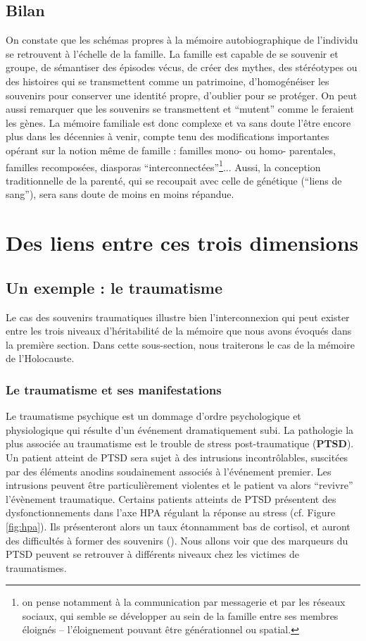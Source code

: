 \documentclass[french]{article}
\begin{document}
		\subsection{Bilan}
			On constate que les schémas propres à la mémoire autobiographique de l'individu se retrouvent à l'échelle de la famille. La famille est capable de se souvenir et groupe, de sémantiser des épisodes vécus, de créer des mythes, des stéréotypes ou des histoires qui se transmettent comme un patrimoine, d'homogénéiser les souvenirs pour conserver une identité propre, d'oublier pour se protéger. On peut aussi remarquer que les souvenirs se transmettent et ``mutent'' comme le feraient les gènes. La mémoire familiale est donc complexe et va sans doute l'être encore plus dans les décennies à venir, compte tenu des modifications importantes opérant sur la notion même de famille : familles mono- ou homo- parentales, familles recomposées, diasporas ``interconnectées''\footnote{on pense notamment à la communication par messagerie et par les réseaux sociaux, qui semble se développer au sein de la famille entre ses membres éloignés -- l'éloignement pouvant être générationnel ou spatial.}... Aussi, la conception traditionnelle de la parenté, qui se recoupait avec celle de génétique (``liens de sang''), sera sans doute de moins en moins répandue.
		
	\section{Des liens entre ces trois dimensions}\label{liens}
		\subsection{Un exemple : le traumatisme}
			Le cas des souvenirs traumatiques illustre bien l'interconnexion qui peut exister entre les trois niveaux d'héritabilité de la mémoire que nous avons évoqués dans la première section. Dans cette sous-section, nous traiterons le cas de la mémoire de l'Holocauste.
			\subsubsection{Le traumatisme et ses manifestations} 
				 Le traumatisme psychique est un dommage d'ordre psychologique et physiologique qui résulte d'un événement dramatiquement subi. La pathologie la plus associée au traumatisme est le trouble de stress post-traumatique (\textbf{PTSD}). Un patient atteint de PTSD sera sujet à des intrusions incontrôlables, suscitées par des éléments anodins soudainement associés à l'événement premier. Les intrusions peuvent être particulièrement violentes et le patient va alors ``revivre'' l'évènement traumatique. Certains patients atteints de PTSD présentent des dysfonctionnements dans l'axe HPA régulant la réponse au stress (cf. Figure \ref{fig:hpa}). Ils présenteront alors un taux étonnamment bas de cortisol, et auront des difficultés à former des souvenirs (\cite{vukojevic2014}). Nous allons voir que des marqueurs du PTSD peuvent se retrouver à différents niveaux chez les victimes de traumatismes.
				
\end{document}
